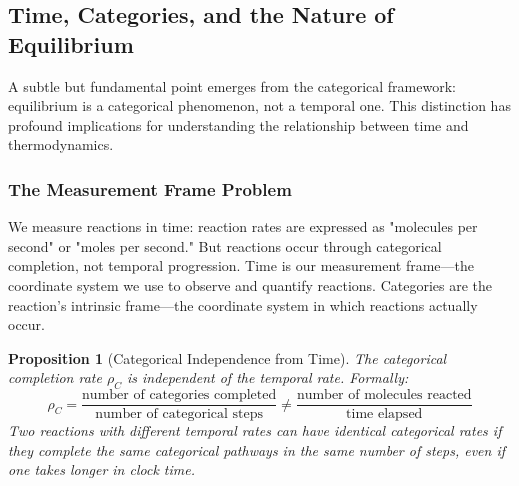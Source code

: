 \documentclass[12pt,a4paper]{article}
\newtheorem{proposition}[theorem]{Proposition}
\theoremstyle{definition}
\theoremstyle{remark}
\begin{document}
\subsection{Time, Categories, and the Nature of Equilibrium}

A subtle but fundamental point emerges from the categorical framework: equilibrium is a categorical phenomenon, not a temporal one. This distinction has profound implications for understanding the relationship between time and thermodynamics.

\subsubsection{The Measurement Frame Problem}

We measure reactions in time: reaction rates are expressed as "molecules per second" or "moles per second." But reactions occur through categorical completion, not temporal progression. Time is our measurement frame—the coordinate system we use to observe and quantify reactions. Categories are the reaction's intrinsic frame—the coordinate system in which reactions actually occur.

\begin{proposition}[Categorical Independence from Time]
\label{prop:categorical_time}
The categorical completion rate $\rho_C$ is independent of the temporal rate. Formally:
\begin{equation}
\rho_C = \frac{\text{number of categories completed}}{\text{number of categorical steps}} \neq \frac{\text{number of molecules reacted}}{\text{time elapsed}}
\label{eq:categorical_rate}
\end{equation}
Two reactions with different temporal rates can have identical categorical rates if they complete the same categorical pathways in the same number of steps, even if one takes longer in clock time.
\end{proposition}
\end{document}
